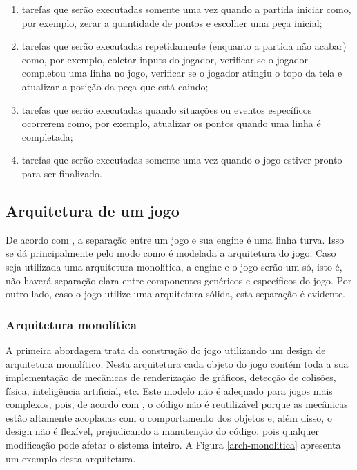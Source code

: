 \begin{enumerate}
\item tarefas que serão executadas somente uma vez quando a partida iniciar como, por exemplo, zerar a quantidade de pontos e escolher uma peça inicial;
\item tarefas que serão executadas repetidamente (enquanto a partida não acabar) como, por exemplo, coletar inputs do jogador, verificar se o jogador completou uma linha no jogo, verificar se o jogador atingiu o topo da tela e atualizar a posição da peça que está caindo;
\item tarefas que serão executadas quando situações ou eventos específicos ocorrerem como, por exemplo, atualizar os pontos quando uma linha é completada;
\item tarefas que serão executadas somente uma vez quando o jogo estiver pronto para ser finalizado.
\end{enumerate}

\subsection{Arquitetura de um jogo}

De acordo com , a separação entre um jogo e sua engine é uma linha turva. Isso se dá principalmente pelo modo como é modelada a arquitetura do jogo. Caso seja utilizada uma arquitetura monolítica, a engine e o jogo serão um só, isto é, não haverá separação clara entre componentes genéricos e específicos do jogo. Por outro lado, caso o jogo utilize uma arquitetura sólida, esta separação é evidente.

\subsubsection{Arquitetura monolítica}

A primeira abordagem trata da construção do jogo utilizando um design de arquitetura monolítico. Nesta arquitetura cada objeto do jogo contém toda a sua implementação de mecânicas de renderização de gráficos, detecção de colisões, física, inteligência artificial, etc. Este modelo não é adequado para jogos mais complexos, pois, de acordo com , o código não é reutilizável porque as mecânicas estão altamente acopladas com o comportamento dos objetos e, além disso, o design não é flexível, prejudicando a manutenção do código, pois qualquer modificação pode afetar o sistema inteiro. A Figura \ref{arch-monolitica} apresenta um exemplo desta arquitetura.

